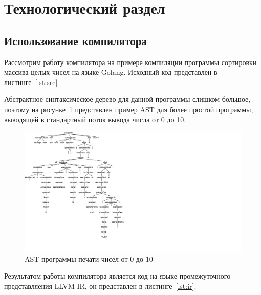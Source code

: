\section{Технологический раздел}\label{sec:technic}
\subsection{Использование компилятора}\label{subsec:compilation}
Рассмотрим работу компилятора на примере компиляции программы сортировки массива целых чисел на языке Golang.
Исходный код представлен в листинге~\ref{lst:src}
\begingroup

\endgroup

Абстрактное синтаксическое дерево для данной программы слишком большое, поэтому на рисунке~\ref{fig:tree}
представлен пример AST для более простой программы, выводящей в стандартный поток вывода числа от 0 до 10.
\begin{figure}[h!]
    \centering
    \includegraphics[scale=0.4]{img/tree}
    \caption{AST программы печати чисел от 0 до 10}
    \label{fig:tree}
\end{figure}

Результатом работы компилятора является код на языке промежуточного представляения LLVM IR, он представлен в
листинге~\ref{lst:ir}.
\begingroup

\endgroup

